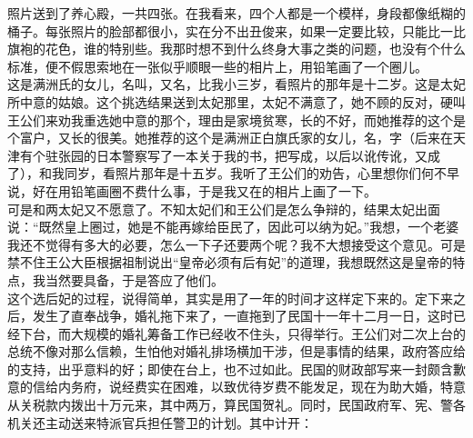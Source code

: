 照片送到了养心殿，一共四张。在我看来，四个人都是一个模样，身段都像纸糊的桶子。每张照片的脸部都很小，实在分不出丑俊来，如果一定要比较，只能比一比旗袍的花色，谁的特别些。我那时想不到什么终身大事之类的问题，也没有个什么标准，便不假思索地在一张似乎顺眼一些的相片上，用铅笔画了一个圈儿。\\

这是满洲氏的女儿，名叫，又名，比我小三岁，看照片的那年是十二岁。这是太妃所中意的姑娘。这个挑选结果送到太妃那里，太妃不满意了，她不顾的反对，硬叫王公们来劝我重选她中意的那个，理由是家境贫寒，长的不好，而她推荐的这个是个富户，又长的很美。她推荐的这个是满洲正白旗氏家的女儿，名，字（后来在天津有个驻张园的日本警察写了一本关于我的书，把写成，以后以讹传讹，又成了），和我同岁，看照片那年是十五岁。我听了王公们的劝告，心里想你们何不早说，好在用铅笔画圈不费什么事，于是我又在的相片上画了一下。\\

可是和两太妃又不愿意了。不知太妃们和王公们是怎么争辩的，结果太妃出面说：“既然皇上圈过，她是不能再嫁给臣民了，因此可以纳为妃。”我想，一个老婆我还不觉得有多大的必要，怎么一下子还要两个呢？我不大想接受这个意见。可是禁不住王公大臣根据祖制说出“皇帝必须有后有妃”的道理，我想既然这是皇帝的特点，我当然要具备，于是答应了他们。\\

这个选后妃的过程，说得简单，其实是用了一年的时间才这样定下来的。定下来之后，发生了直奉战争，婚礼拖下来了，一直拖到了民国十一年十二月一日，这时已经下台，而大规模的婚礼筹备工作已经收不住头，只得举行。王公们对二次上台的总统不像对那么信赖，生怕他对婚礼排场横加干涉，但是事情的结果，政府答应给的支持，出乎意料的好；即使在台上，也不过如此。民国的财政部写来一封颇含歉意的信给内务府，说经费实在困难，以致优待岁费不能发足，现在为助大婚，特意从关税款内拨出十万元来，其中两万，算民国贺礼。同时，民国政府军、宪、警各机关还主动送来特派官兵担任警卫的计划。其中计开：\\

